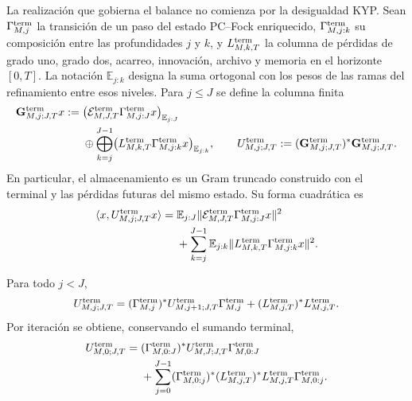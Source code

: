 La realización que gobierna el balance no comienza por la desigualdad KYP.
Sean \(\Gamma_{M,j}^{\rm term}\) la transición de un paso del estado
PC--Fock enriquecido, \(\Gamma_{M,j:k}^{\rm term}\) su composición entre
las profundidades \(j\) y \(k\), y
\(L_{M,k,T}^{\rm term}\) la columna de pérdidas de grado uno, grado dos,
acarreo, innovación, archivo y memoria en el horizonte \([0,T]\). La
notación \(\mathbb E_{j:k}\) designa la suma ortogonal con los pesos de
las ramas del refinamiento entre esos niveles. Para \(j\leq J\) se define
la columna finita
\begin{equation}\label{eq:amp-ns-owner-columna-gram-truncado}
 \begin{aligned}
 \mathbf G_{M,j;J,T}^{\rm term}x
 :={}&
 \bigl(\mathcal E_{M,J,T}^{\rm term}
       \Gamma_{M,j:J}^{\rm term}x\bigr)_{\mathbb E_{j:J}}\\
 &\oplus
 \bigoplus_{k=j}^{J-1}
 \bigl(L_{M,k,T}^{\rm term}
       \Gamma_{M,j:k}^{\rm term}x\bigr)_{\mathbb E_{j:k}},
 \qquad
 U_{M,j;J,T}^{\rm term}
 :=(\mathbf G_{M,j;J,T}^{\rm term})^*
    \mathbf G_{M,j;J,T}^{\rm term}.
 \end{aligned}
\end{equation}
En particular, el almacenamiento es un Gram truncado construido con el
terminal y las pérdidas futuras del mismo estado. Su forma cuadrática es
\begin{equation}\label{eq:amp-ns-owner-gram-truncado}
 \begin{aligned}
 \langle x,U_{M,j;J,T}^{\rm term}x\rangle
 ={}&\mathbb E_{j:J}
 \|\mathcal E_{M,J,T}^{\rm term}
       \Gamma_{M,j:J}^{\rm term}x\|^2\\
 &+\sum_{k=j}^{J-1}\mathbb E_{j:k}
 \|L_{M,k,T}^{\rm term}
       \Gamma_{M,j:k}^{\rm term}x\|^2 .
 \end{aligned}
\end{equation}

\begin{lemma}
\label{lem:amp-ns-owner-stein-truncado}
Para todo \(j<J\),
\begin{equation}\label{eq:amp-ns-owner-stein-truncado}
 U_{M,j;J,T}^{\rm term}
 =(\Gamma_{M,j}^{\rm term})^*
   U_{M,j+1;J,T}^{\rm term}\Gamma_{M,j}^{\rm term}
  +(L_{M,j,T}^{\rm term})^*L_{M,j,T}^{\rm term}.
\end{equation}
Por iteración se obtiene, conservando el sumando terminal,
\begin{equation}\label{eq:amp-ns-owner-telescopio-truncado}
 \begin{aligned}
 U_{M,0;J,T}^{\rm term}
 ={}&(\Gamma_{M,0:J}^{\rm term})^*
      U_{M,J;J,T}^{\rm term}\Gamma_{M,0:J}^{\rm term}\\
 &+\sum_{j=0}^{J-1}
   (\Gamma_{M,0:j}^{\rm term})^*
   (L_{M,j,T}^{\rm term})^*L_{M,j,T}^{\rm term}
   \Gamma_{M,0:j}^{\rm term}.
 \end{aligned}
\end{equation}
\end{lemma}

